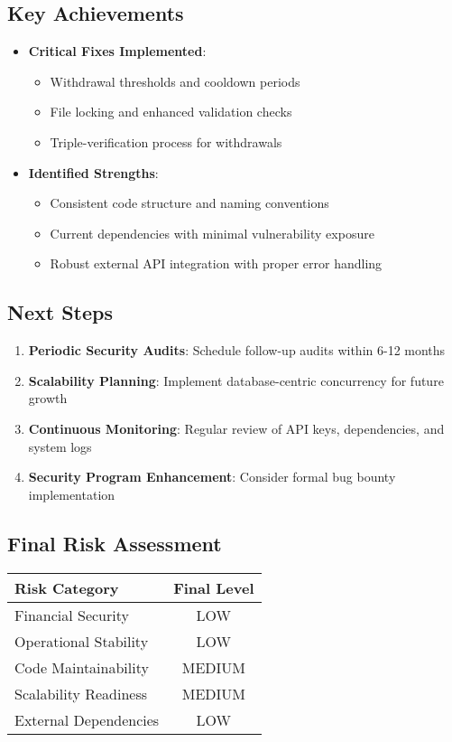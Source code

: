\documentclass[11pt,a4paper]{article}
\begin{document}
\subsection{Key Achievements}
\begin{itemize}
    \item \textbf{Critical Fixes Implemented}:
    \begin{itemize}
        \item Withdrawal thresholds and cooldown periods
        \item File locking and enhanced validation checks
        \item Triple-verification process for withdrawals
    \end{itemize}
    \item \textbf{Identified Strengths}:
    \begin{itemize}
        \item Consistent code structure and naming conventions
        \item Current dependencies with minimal vulnerability exposure
        \item Robust external API integration with proper error handling
    \end{itemize}
\end{itemize}

\subsection{Next Steps}
\begin{enumerate}
    \item \textbf{Periodic Security Audits}: Schedule follow-up audits within 6-12 months
    \item \textbf{Scalability Planning}: Implement database-centric concurrency for future growth
    \item \textbf{Continuous Monitoring}: Regular review of API keys, dependencies, and system logs
    \item \textbf{Security Program Enhancement}: Consider formal bug bounty implementation
\end{enumerate}

\subsection{Final Risk Assessment}
\begin{center}
\begin{tabular}{|l|c|}
\hline
\textbf{Risk Category} & \textbf{Final Level} \\
\hline
Financial Security & \textcolor{danzoGreen}{LOW} \\
Operational Stability & \textcolor{danzoGreen}{LOW} \\
Code Maintainability & \textcolor{danzoOrange}{MEDIUM} \\
Scalability Readiness & \textcolor{danzoOrange}{MEDIUM} \\
External Dependencies & \textcolor{danzoGreen}{LOW} \\
\hline
\end{tabular}
\end{center}
\end{document}
